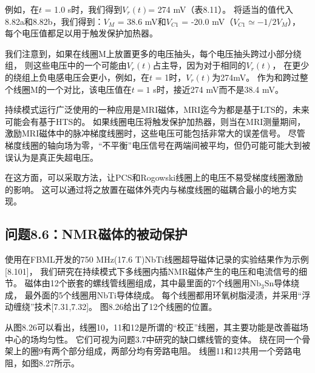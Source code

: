 例如，在$t$ = 1.0 s时，我们得到$V_r(t)$= 274 mV（表8.11）。
将适当的值代入 8.82a和8.82b，我们得到：$V_M$ = 38.6 mV和$V_{C1}$ = -20.0 mV（$V_{C1}\simeq -1/2 V_M$），
每个电压值都足以用于触发保护加热器。

我们注意到，如果在线圈M上放置更多的电压抽头，每个电压抽头跨过小部分绕组，
则这些电压中的一个可能由$V_r(t)$占主导，因为对于相同的$V_r(t)$，
在更少的绕组上负电感电压会更小，例如，在$t$ = 1时，$V_r(t)$为274mV。
作为和跨过整个线圈M的一个对比，该电压值在$t=1$ s时，接近274 mV而不是38.4 mV。

持续模式运行广泛使用的一种应用是MRI磁体，MRI迄今为都是基于LTS的，未来可能会有基于HTS的。
如果线圈电压将触发保护加热器，则当在MRI测量期间，激励MRI磁体中的脉冲梯度线圈时，这些电压可能包括非常大的误差信号。
尽管梯度线圈的轴向场为零，“不平衡”电压信号在两端间被平均，但仍可能可能大到被误认为是真正失超电压。

在这方面，可以采取方法，让PCS和Rogowski线圈上的电压不易受梯度线圈激励的影响。
这可以通过将之放置在磁体外壳内与梯度线圈的磁耦合最小的地方实现。

\subsection{问题8.6：NMR磁体的被动保护}
使用在FBML开发的750 MHz(17.6 T)NbTi线圈超导磁体记录的实验结果作为示例[8.101]，
我们研究在持续模式下多线圈内插NMR磁体产生的电压和电流信号的细节。
磁体由12个嵌套的螺线管线圈组成，其中最里面的7个线圈用$\mathrm{Nb_3Sn}$导体绕成，
最外面的5个线圈用NbTi导体绕成。
 每个线圈都用环氧树脂浸渍，并采用“浮动缠绕”技术[7.31,7.32]。 图8.26给出了12个线圈的位置。

从图8.26可以看出，线圈10，11和12是所谓的“校正”线圈，其主要功能是改善磁场中心的场均匀性。
 它们可视为问题3.7中研究的缺口螺线管的变体。 
 绕在同一个骨架上的圈9有两个部分组成，两部分均有旁路电阻。
 线圈11和12共用一个旁路电阻，如图8.27所示。

